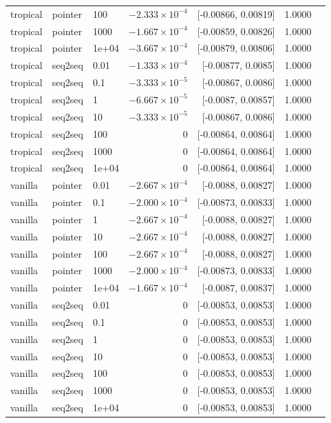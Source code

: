 \documentclass[10pt]{article}
\begin{document}
{\begin{longtable}{lllrrrl}
tropical & pointer & 100 & $-2.333\times10^{-4}$ & [-0.00866, 0.00819] & 1.0000 & \\
tropical & pointer & 1000 & $-1.667\times10^{-4}$ & [-0.00859, 0.00826] & 1.0000 & \\
tropical & pointer & 1e+04 & $-3.667\times10^{-4}$ & [-0.00879, 0.00806] & 1.0000 & \\
tropical & seq2seq & 0.01 & $-1.333\times10^{-4}$ & [-0.00877, 0.0085] & 1.0000 & \\
tropical & seq2seq & 0.1 & $-3.333\times10^{-5}$ & [-0.00867, 0.0086] & 1.0000 & \\
tropical & seq2seq & 1 & $-6.667\times10^{-5}$ & [-0.0087, 0.00857] & 1.0000 & \\
tropical & seq2seq & 10 & $-3.333\times10^{-5}$ & [-0.00867, 0.0086] & 1.0000 & \\
tropical & seq2seq & 100 & 0 & [-0.00864, 0.00864] & 1.0000 & \\
tropical & seq2seq & 1000 & 0 & [-0.00864, 0.00864] & 1.0000 & \\
tropical & seq2seq & 1e+04 & 0 & [-0.00864, 0.00864] & 1.0000 & \\
vanilla & pointer & 0.01 & $-2.667\times10^{-4}$ & [-0.0088, 0.00827] & 1.0000 & \\
vanilla & pointer & 0.1 & $-2.000\times10^{-4}$ & [-0.00873, 0.00833] & 1.0000 & \\
vanilla & pointer & 1 & $-2.667\times10^{-4}$ & [-0.0088, 0.00827] & 1.0000 & \\
vanilla & pointer & 10 & $-2.667\times10^{-4}$ & [-0.0088, 0.00827] & 1.0000 & \\
vanilla & pointer & 100 & $-2.667\times10^{-4}$ & [-0.0088, 0.00827] & 1.0000 & \\
vanilla & pointer & 1000 & $-2.000\times10^{-4}$ & [-0.00873, 0.00833] & 1.0000 & \\
vanilla & pointer & 1e+04 & $-1.667\times10^{-4}$ & [-0.0087, 0.00837] & 1.0000 & \\
vanilla & seq2seq & 0.01 & 0 & [-0.00853, 0.00853] & 1.0000 & \\
vanilla & seq2seq & 0.1 & 0 & [-0.00853, 0.00853] & 1.0000 & \\
vanilla & seq2seq & 1 & 0 & [-0.00853, 0.00853] & 1.0000 & \\
vanilla & seq2seq & 10 & 0 & [-0.00853, 0.00853] & 1.0000 & \\
vanilla & seq2seq & 100 & 0 & [-0.00853, 0.00853] & 1.0000 & \\
vanilla & seq2seq & 1000 & 0 & [-0.00853, 0.00853] & 1.0000 & \\
vanilla & seq2seq & 1e+04 & 0 & [-0.00853, 0.00853] & 1.0000 & \\
\bottomrule
\end{longtable}
}
\end{document}
